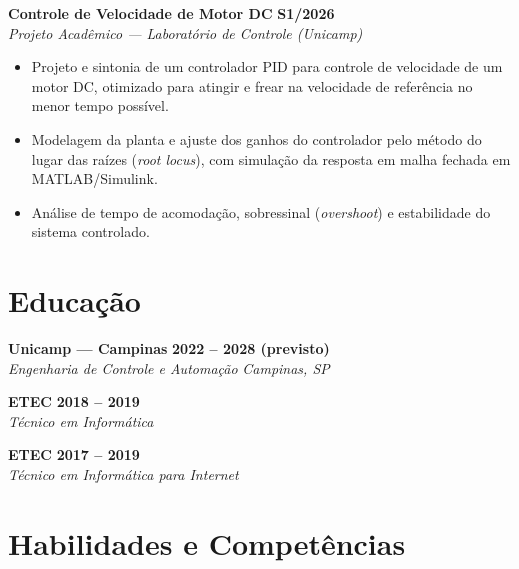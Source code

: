 \documentclass[a4paper,11pt]{article}
\newcommand{\entry}[4]{%
  \noindent\textbf{#1} \hfill \textbf{#2}\\
  \textit{#3} \hfill \textit{#4}
  \vspace{3pt}
}
\newcommand{\entrygap}{\vspace{9pt}}
\begin{document}
\entry{Controle de Velocidade de Motor DC}{S1/2026}{Projeto Acadêmico --- Laboratório de Controle (Unicamp)}{}
\begin{itemize}
\item Projeto e sintonia de um controlador PID para controle de velocidade de um motor DC, otimizado para atingir e frear na velocidade de referência no menor tempo possível.
\item Modelagem da planta e ajuste dos ganhos do controlador pelo método do lugar das raízes (\textit{root locus}), com simulação da resposta em malha fechada em MATLAB/Simulink.
\item Análise de tempo de acomodação, sobressinal (\textit{overshoot}) e estabilidade do sistema controlado.
\end{itemize}
\entrygap

\section*{Educação}

\entry{Unicamp --- Campinas}{2022 -- 2028 (previsto)}{Engenharia de Controle e Automação}{Campinas, SP}
\vspace{4pt}

\entry{ETEC}{2018 -- 2019}{Técnico em Informática}{}
\vspace{4pt}

\entry{ETEC}{2017 -- 2019}{Técnico em Informática para Internet}{}


\section*{Habilidades e Competências}
\end{document}
